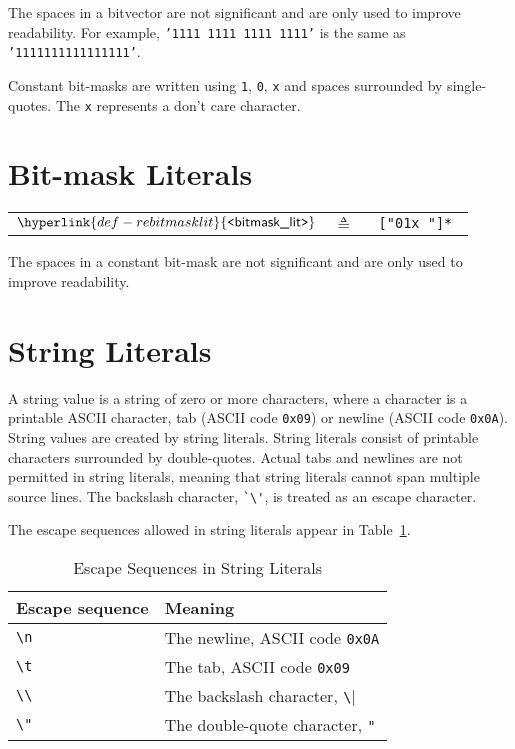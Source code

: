 \documentclass{book}
\newcommand\Char[1]{\fbox{#1}}
\newcommand\REbitmasklit[0]{\hyperlink{def-rebitmasklit}{\texttt{<}\textsf{bitmask\_lit}\texttt{>}}}
\begin{document}
The spaces in a bitvector are not significant and are only used to improve readability.
For example, \texttt{'1111 1111 1111 1111'} is the same as \texttt{'1111111111111111'}.

Constant bit-masks are written using \texttt{1}, \texttt{0}, \texttt{x} and spaces surrounded by single-quotes.
The \texttt{x} represents a don’t care character.

\section{Bit-mask Literals}

\hypertarget{def-rebitmasklit}{}
\begin{center}
\begin{tabular}{rcl}
$\REbitmasklit$ &$\triangleq$& \texttt{\Char{'} ["01x "]* \Char{'}}
\end{tabular}
\end{center}

The spaces in a constant bit-mask are not significant and are only used to improve readability.

\section{String Literals}

A string value is a string of zero or more characters, where a character is a printable ASCII character, tab (ASCII
code \texttt{0x09}) or newline (ASCII code \texttt{0x0A}). String values are created by string literals.
String literals consist of printable characters surrounded by double-quotes. Actual tabs and newlines are not
permitted in string literals, meaning that string literals cannot span multiple source lines. The backslash character,
\verb|`\'|, is treated as an escape character.

The escape sequences allowed in string literals appear in Table~\ref{ta:SscapeSeuqnces}.
\begin{table}
\caption{Escape Sequences in String Literals\label{ta:SscapeSeuqnces}}
\begin{center}
\begin{tabular}{ll}
\hline
\textbf{Escape sequence} & \textbf{Meaning}\\
\hline
\verb|\n| & The newline, ASCII code \texttt{0x0A}\\
\verb|\t| & The tab, ASCII code \texttt{0x09}\\
\verb|\\| & The backslash character, \verb|\|\\
\verb|\"| & The double-quote character, \texttt{"}\\
\hline
\end{tabular}
\end{center}
\end{table}
\end{document}
